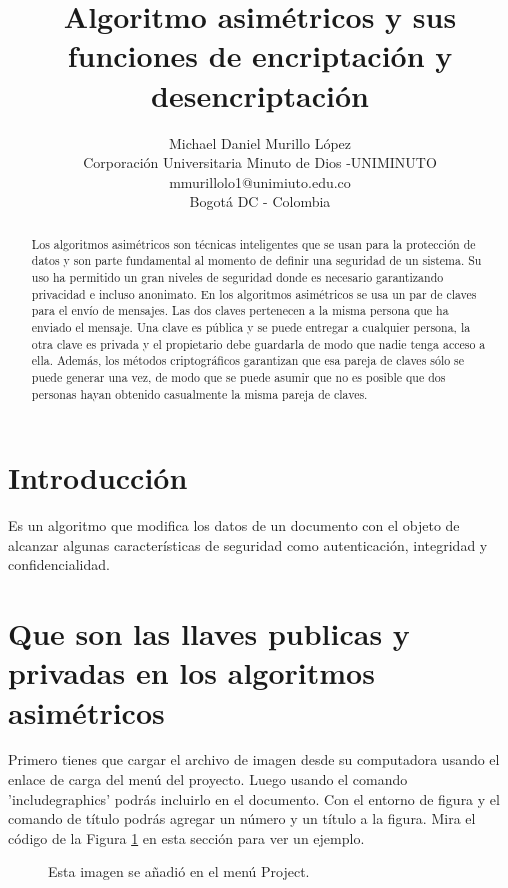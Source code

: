 \documentclass[a4paper]{article}
\title{Algoritmo asimétricos y sus funciones de encriptación y desencriptación}
\author{Michael Daniel Murillo López\\
  \small Corporación Universitaria Minuto de Dios -UNIMINUTO\\
  \small mmurillolo1@unimiuto.edu.co\\
  \small Bogotá DC - Colombia
  \date{}
}
\begin{document}
\maketitle
 
\begin{abstract}
Los algoritmos  asimétricos son técnicas inteligentes que se usan para la protección  de datos  y  son parte fundamental al momento de definir una seguridad de un sistema. Su uso ha permitido un gran niveles de seguridad donde es necesario garantizando privacidad e incluso anonimato. En los algoritmos asimétricos se usa un par de claves para el envío de mensajes. Las dos claves pertenecen a la misma persona que ha enviado el mensaje. Una clave es pública y se puede entregar a cualquier persona, la otra clave es privada y el propietario debe guardarla de modo que nadie tenga acceso a ella. Además, los métodos criptográficos garantizan que esa pareja de claves sólo se puede generar una vez, de modo que se puede asumir que no es posible que dos personas hayan obtenido casualmente la misma pareja de claves.

\end{abstract}

\section{Introducci\'on}

Es un algoritmo que modifica los datos de un documento con el objeto de alcanzar algunas características de seguridad como autenticación, integridad y confidencialidad.

\section{Que son las llaves publicas y privadas en los algoritmos asimétricos}

Primero tienes que cargar el archivo de imagen desde su computadora usando el enlace de carga del menú del proyecto. Luego usando el comando 'includegraphics' podrás incluirlo en el documento. Con el entorno de figura y el comando de título podrás agregar un número y un título a la figura. Mira el código de la Figura \ref{fig:tesla} en esta sección para ver un ejemplo.

\begin{figure}
\centering
\caption{\label{fig:tesla}Esta imagen se añadió en el menú Project.}
\end{figure}
\end{document}
